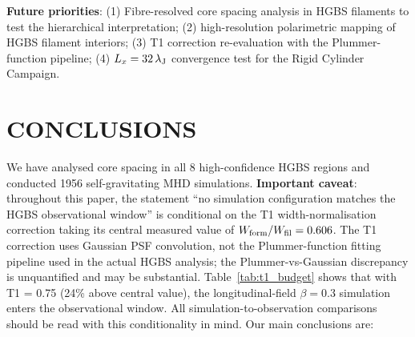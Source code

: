 \documentclass[twoside,twocolumn]{mnras}
\begin{document}
\textbf{Future priorities}: (1) Fibre-resolved core spacing analysis in HGBS filaments
to test the hierarchical interpretation; (2) high-resolution polarimetric mapping of
HGBS filament interiors; (3) T1 correction re-evaluation with the Plummer-function
pipeline; (4) $L_x = 32\,\lambda_{\rm J}$ convergence test for the Rigid Cylinder Campaign.

\section{CONCLUSIONS}

We have analysed core spacing in all 8 high-confidence HGBS regions and conducted
1956 self-gravitating MHD simulations. \textbf{Important caveat}: throughout this
paper, the statement ``no simulation configuration matches the HGBS observational
window'' is conditional on the T1 width-normalisation correction taking its central
measured value of $W_{\rm form}/W_{\rm fil} = 0.606$. The T1 correction uses Gaussian
PSF convolution, not the Plummer-function fitting pipeline used in the actual HGBS
analysis; the Plummer-vs-Gaussian discrepancy is unquantified and may be substantial.
Table~\ref{tab:t1_budget} shows that with T1 = 0.75 (24\% above central value), the
longitudinal-field $\beta = 0.3$ simulation enters the observational window. All
simulation-to-observation comparisons should be read with this conditionality in mind.
Our main conclusions are:
\end{document}
